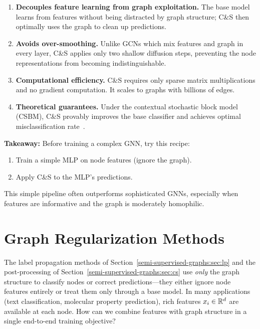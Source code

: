\begin{notechapter}
\begin{enumerate}
    \item \textbf{Decouples feature learning from graph exploitation.}
          The base model learns from features without being distracted by graph
          structure; C\&S then optimally uses the graph to clean up predictions.
    \item \textbf{Avoids over-smoothing.} Unlike GCNs which mix features and
          graph in every layer, C\&S applies only two shallow diffusion steps,
          preventing the node representations from becoming indistinguishable.
    \item \textbf{Computational efficiency.} C\&S requires only sparse matrix
          multiplications and no gradient computation. It scales to graphs with
          billions of edges.
    \item \textbf{Theoretical guarantees.} Under the contextual stochastic
          block model (CSBM), C\&S provably improves the base classifier and
          achieves optimal misclassification rate~\cite{semi-supervised-graphs:huang2021}.
\end{enumerate}

\begin{insightbox}
\textbf{Takeaway:} Before training a complex GNN, try this recipe:
\begin{enumerate}
    \item Train a simple MLP on node features (ignore the graph).
    \item Apply C\&S to the MLP's predictions.
\end{enumerate}
This simple pipeline often outperforms sophisticated GNNs, especially when
features are informative and the graph is moderately homophilic.
\end{insightbox}


\newpage
\section{Graph Regularization Methods}
\label{semi-supervised-graphs:sec:reg}

The label propagation methods of Section~\ref{semi-supervised-graphs:sec:lp} and the post-processing
of Section~\ref{semi-supervised-graphs:sec:cs} use \emph{only} the graph structure to classify nodes
or correct predictions---they either ignore node features entirely or treat
them only through a base model. In many applications (text classification,
molecular property prediction), rich features $x_i \in \mathbb{R}^d$ are available at
each node. How can we combine features with graph structure in a single
end-to-end training objective?


\end{notechapter}
